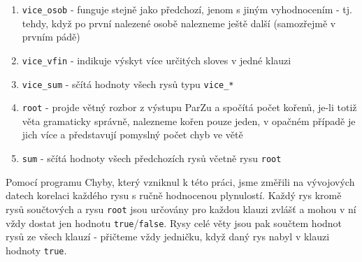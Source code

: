 \documentclass[12pt,a4paper]{report}
\begin{document}
\begin{enumerate}
\item{\texttt{vice\_osob} - funguje stejně jako předchozí, jenom s jiným vyhodnocením - tj. tehdy, když po první nalezené osobě nalezneme ještě další (samozřejmě v prvním pádě)}
\item{\texttt{vice\_vfin} - indikuje výskyt více určitých sloves v jedné klauzi}
\item{\texttt{vice\_sum} - sčítá hodnoty všech rysů typu \texttt{vice\_*}}
\item{\texttt{root} - projde větný rozbor z výstupu ParZu a spočítá počet kořenů, je-li totiž věta gramaticky správně, nalezneme kořen pouze jeden, v opačném případě je jich více a představují pomyslný počet chyb ve větě}
\item{\texttt{sum} - sčítá hodnoty všech předchozích rysů včetně rysu \texttt{root}}
\end{enumerate}

Pomocí programu Chyby, který vzniknul k této práci, jsme změřili na vývojových datech korelaci každého rysu s ručně hodnocenou plynulostí. Každý rys kromě rysů součtových a rysu \texttt{root} jsou určovány pro každou klauzi zvlášť a mohou v ní vždy dostat jen hodnotu \texttt{true}/\texttt{false}. Rysy celé věty jsou pak součtem hodnot rysů ze všech klauzí - přičteme vždy jedničku, když daný rys nabyl v klauzi hodnoty \texttt{true}.
\end{document}
